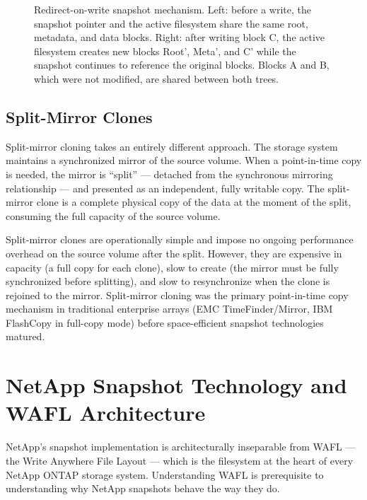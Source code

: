 \begin{figure}[htbp]
\caption{Redirect-on-write snapshot mechanism. Left: before a write, the snapshot pointer and the active filesystem share the same root, metadata, and data blocks. Right: after writing block C, the active filesystem creates new blocks Root', Meta', and C' while the snapshot continues to reference the original blocks. Blocks A and B, which were not modified, are shared between both trees.}
\label{fig:cow-snapshot}
\end{figure}

\subsection{Split-Mirror Clones}

Split-mirror cloning takes an entirely different approach. The storage system maintains a synchronized mirror of the source volume. When a point-in-time copy is needed, the mirror is ``split'' --- detached from the synchronous mirroring relationship --- and presented as an independent, fully writable copy. The split-mirror clone is a complete physical copy of the data at the moment of the split, consuming the full capacity of the source volume.

Split-mirror clones are operationally simple and impose no ongoing performance overhead on the source volume after the split. However, they are expensive in capacity (a full copy for each clone), slow to create (the mirror must be fully synchronized before splitting), and slow to resynchronize when the clone is rejoined to the mirror. Split-mirror cloning was the primary point-in-time copy mechanism in traditional enterprise arrays (EMC TimeFinder/Mirror, IBM FlashCopy in full-copy mode) before space-efficient snapshot technologies matured.

\section{NetApp Snapshot Technology and WAFL Architecture}

NetApp's snapshot implementation is architecturally inseparable from WAFL --- the Write Anywhere File Layout --- which is the filesystem at the heart of every NetApp ONTAP storage system. Understanding WAFL is prerequisite to understanding why NetApp snapshots behave the way they do.

